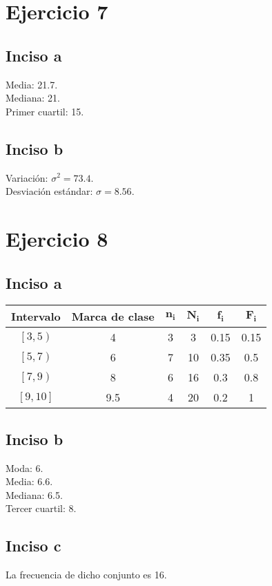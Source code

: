 \documentclass[a4paper,12pt]{article}
\begin{document}
\section*{Ejercicio 7}
\subsection*{Inciso a}
Media: 21.7.\\
Mediana: 21.\\
Primer cuartil: 15.
\subsection*{Inciso b}
Variación: $ \sigma^{2} = 73.4 $.\\
Desviación estándar: $ \sigma = 8.56 $.
\section*{Ejercicio 8}
\subsection*{Inciso a}
\begin{tabular}{|c|c|c|c|c|c|}
	\hline
	  \textbf{Intervalo}   & \textbf{Marca de clase} & $ \mathbf{n_i} $ & $ \mathbf{N_i} $ & $\mathbf{ f_i} $ & $ \mathbf{F_i} $ \\ \hline
	$ \left[ 3,5\right) $  &            4            &        3         &        3         &       0.15       &       0.15       \\ \hline
	$ \left[ 5,7\right) $  &            6            &        7         &        10        &       0.35       &       0.5        \\ \hline
	$ \left[ 7,9\right) $  &            8            &        6         &        16        &       0.3        &       0.8        \\ \hline
	$ \left[ 9,10\right] $ &           9.5           &        4         &        20        &       0.2        &        1         \\ \hline
\end{tabular}
\subsection*{Inciso b}
Moda: 6.\\
Media: 6.6.\\
Mediana: 6.5.\\
Tercer cuartil: 8.

\subsection*{Inciso c}
La frecuencia de dicho conjunto es 16.
\end{document}

